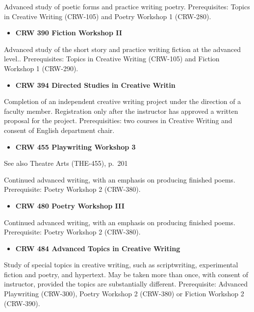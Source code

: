 \documentclass[
  letterpaper,
]{scrbook}
\providecommand{\tightlist}{%
  \setlength{\itemsep}{0pt}\setlength{\parskip}{0pt}}
\begin{document}
Advanced study of poetic forms and practice writing poetry.
Prerequisites: Topics in Creative Writing (CRW-105) and Poetry Workshop
1 (CRW-280).

\begin{itemize}
\tightlist
\item
  \textbf{CRW 390 Fiction Workshop II}
\end{itemize}

Advanced study of the short story and practice writing fiction at the
advanced level.. Prerequisites: Topics in Creative Writing (CRW-105) and
Fiction Workshop 1 (CRW-290).

\begin{itemize}
\tightlist
\item
  \textbf{CRW 394 Directed Studies in Creative Writin}
\end{itemize}

Completion of an independent creative writing project under the
direction of a faculty member. Registration only after the instructor
has approved a written proposal for the project. Prerequisities: two
courses in Creative Writing and consent of English department chair.

\begin{itemize}
\tightlist
\item
  \textbf{CRW 455 Playwriting Workshop 3}
\end{itemize}

See also Theatre Arts (THE-455), p.~201

Continued advanced writing, with an emphasis on producing finished
poems. Prerequisite: Poetry Workshop 2 (CRW-380).

\begin{itemize}
\tightlist
\item
  \textbf{CRW 480 Poetry Workshop III}
\end{itemize}

Continued advanced writing, with an emphasis on producing finished
poems. Prerequisite: Poetry Workshop 2 (CRW-380).

\begin{itemize}
\tightlist
\item
  \textbf{CRW 484 Advanced Topics in Creative Writing}
\end{itemize}

Study of special topics in creative writing, such as scriptwriting,
experimental fiction and poetry, and hypertext. May be taken more than
once, with consent of instructor, provided the topics are substantially
different. Prerequisite: Advanced Playwriting (CRW-300), Poetry Workshop
2 (CRW-380) or Fiction Workshop 2 (CRW-390).
\end{document}
